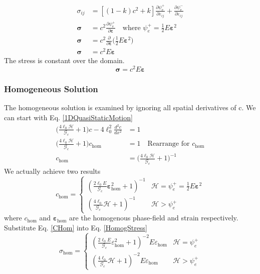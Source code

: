 \documentclass[12pt,3p]{article}
\numberwithin{equation}{section}
\begin{document}
\begin{align*}
\sigma_{i j} &= \left[(1-k) c^{2}+k\right] \frac{\partial \psi_{\mathrm{e}}^{+}}{\partial \varepsilon_{i j}} + \frac{\partial \psi_{\mathrm{e}}^{-}}{\partial \varepsilon_{i j}} \\
\boldsymbol{\sigma} &= c^2 \frac{\partial \psi_{\mathrm{e}}^{+}}{\partial \boldsymbol{\varepsilon}} \quad \text{where }  \psi_{e}^{+} = \frac{1}{2} E \boldsymbol{\varepsilon}^2 \\
\boldsymbol{\sigma} &= c^2 \frac{\partial}{\partial \boldsymbol{\varepsilon}} \bigg( \frac{1}{2} E \boldsymbol{\varepsilon}^2 \bigg) \\
\boldsymbol{\sigma} &= c^2 E \boldsymbol{\varepsilon}
\end{align*}
The stress is constant over the domain. 
\begin{equation}\label{HomogStress}
\boldsymbol{\sigma} = c^2 E \boldsymbol{\varepsilon}
\end{equation}

\subsubsection{Homogeneous Solution}
The homogeneous solution is examined by ignoring all spatial derivatives of c. We can start with Eq. \ref{1DQuasiStaticMotion}
\begin{align*}
\bigg( \frac{4 \ell_0 \mathcal{H}}{\mathcal{G}_c} + 1 \bigg) c - 4 \ell_{0}^2 \frac{d^2 c}{d x^2} &= 1 \\
\bigg( \frac{4 \ell_0 \mathcal{H}}{\mathcal{G}_c} + 1 \bigg) c_{\mathrm{hom}} &= 1 \quad \text{Rearrange for } c_{\mathrm{hom}} \\
c_{\mathrm{hom}} &= \bigg( \frac{4 \ell_0 \mathcal{H}}{\mathcal{G}_c} + 1 \bigg)^{-1}
\end{align*}
We actually achieve two results 
\begin{equation}\label{CHom}
c_{\mathrm{hom}}=\left\{\begin{array}{ll}
\left(\frac{2 \ell_{0} E}{\mathcal{G}_{c}} \boldsymbol{\varepsilon}_{\mathrm{hom}}^{2}+1\right)^{-1} & \mathcal{H}  = \psi_{e}^{+} = \frac{1}{2} E \boldsymbol{\varepsilon}^2 \\
\left(\frac{4 \ell_{0}}{\mathcal{G}_{c}} \mathcal{H}+1\right)^{-1} & \mathcal{H} > \psi_{e}^{+}
\end{array}\right.
\end{equation}
where $c_{\mathrm{hom}}$ and $\boldsymbol{\varepsilon}_{\mathrm{hom}}$ are the homogenous phase-field and strain respectively. Substitute Eq. \ref{CHom} into Eq. \ref{HomogStress}
\begin{equation}
\sigma_{\mathrm{hom}}=\left\{\begin{array}{ll}
\left(\frac{2 \ell_{0} E}{\mathcal{G}_{c}} \varepsilon_{\mathrm{hom}}^{2}+1\right)^{-2} E \varepsilon_{\mathrm{hom}} & \mathcal{H} = \psi_{e}^{+} \\
\left(\frac{4 \ell_{0}}{\mathcal{G}_{c}} \mathcal{H}+1\right)^{-2} E \varepsilon_{\mathrm{hom}} & \mathcal{H} > \psi_{e}^{+}
\end{array}\right.
\end{equation}
\end{document}
